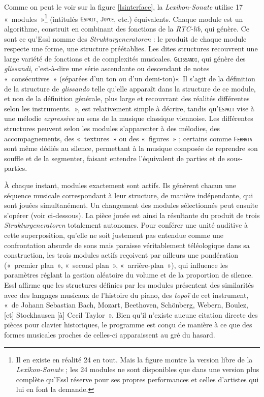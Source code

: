 \documentclass[a4paper,12pt]{article}
\newcommand{\guill}[1]{«~#1~»}
\newcommand{\module}[1]{\texttt{\textsc{#1}}}
\begin{document}
Comme on peut le voir sur la figure \ref{lsinterface}, la \emph{Lexikon-Sonate} utilise 17 \guill{modules}\footnote{Il en existe en réalité 24 en tout. Mais la figure montre la version libre de la \emph{Lexikon-Sonate} ; les 24 modules ne sont disponibles que dans une version plus complète qu'Essl réserve pour ses propres performances et celles d'artistes qui lui en font la demande.} (intitulés \module{Esprit}, \module{Joyce}, etc.) équivalents. Chaque module est un algorithme, construit en combinant des fonctions de la \emph{RTC-lib}, qui génère. Ce sont ce qu'Essl nomme des \emph{Strukturgeneratoren} : le produit de chaque module respecte une forme, une structure préétablies. Les dites structures recouvrent une large variété de fonctions et de complexités musicales. \texttt{\textsc{Glissandi}}, qui génère des \emph{glissandi}, c'est-à-dire une série ascendante ou descendant de notes \guill{consécutives} (séparées d'un ton ou d'un demi-ton)\guill{Il s'agit de la définition de la structure de \emph{glissando} telle qu'elle apparaît dans la structure de ce module, et non de la définition générale, plus large et recouvrant des réalités différentes selon les instruments.}, est relativement simple à décrire, tandis qu'\texttt{\textsc{Esprit}} vise à une mélodie \emph{expressive} au sens de la musique classique viennoise. Les différentes structures peuvent selon les modules s'apparenter à des mélodies, des accompagnements, des \guill{textures} ou des \guill{figures} ; certains comme \texttt{\textsc{Fermata}} sont même dédiés au silence, permettant à la musique composée de reprendre son souffle et de la segmenter, faisant entendre l'équivalent de parties et de sous-parties.

À chaque instant, modules exactement sont actifs. Ils génèrent chacun une séquence musicale correspondant à leur structure, de manière indépendante, qui sont jouées simultanément. Un changement des modules sélectionnés peut ensuite s'opérer (voir ci-dessous). La pièce jouée est ainsi la résultante du produit de trois \emph{Strukturgeneratoren} totalement autonomes. Pour conférer une unité auditive à cette superposition, qu'elle ne soit justement pas entendue comme une confrontation absurde de sons mais paraisse véritablement téléologique dans sa construction, les trois modules actifs reçoivent par ailleurs une pondération (\guill{premier plan}, \guill{second plan}, \guill{arrière-plan}), qui influence les paramètres réglant la gestion aléatoire du volume et de la proportion de silence. Essl affirme que les structures définies par les modules présentent des similarités avec des langages musicaux de l'histoire du piano, des \emph{topo\"i} de cet instrument, \guill{de Johann Sebastian Bach, Mozart, Beethoven, Schönberg, Webern, Boulez, [et] Stockhausen [à] Cecil Taylor}. Bien qu'il n'existe aucune citation directe des pièces pour clavier historiques, le programme est conçu de manière à ce que des formes musicales proches de celles-ci apparaissent au gré du hasard.
\end{document}
